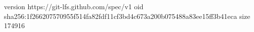 version https://git-lfs.github.com/spec/v1
oid sha256:1f266207570955f514fa82fdf11cf3bd4c673a200b075488a83ee15ff3b41eca
size 174916
